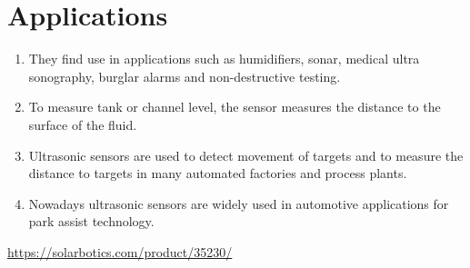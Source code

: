 \documentclass[a4paper,29.6pt]{article}
\begin{document}
\newpage
\section{Applications}
\begin{small}
\begin{enumerate}
\item  They find use in applications such as humidifiers, sonar, medical ultra sonography, burglar alarms and non-destructive testing.
\item To measure tank or channel level, the sensor measures the distance to the surface of the fluid.
\item Ultrasonic sensors are used to detect movement of targets and to measure the distance to targets in many automated factories and process plants.
\item Nowadays ultrasonic sensors are widely used in automotive applications for park assist technology.
\end{enumerate}



\end{small}


\begin{thebibliography}{99}
\url{https://solarbotics.com/product/35230/}

\end{thebibliography}
\end{document}
